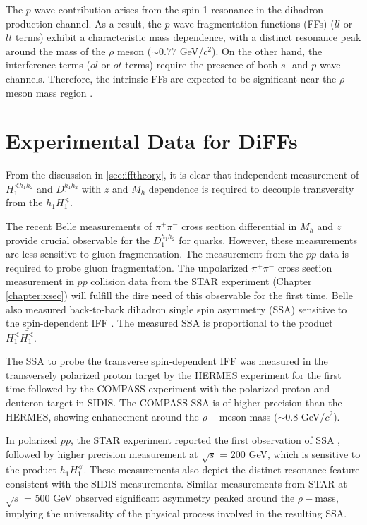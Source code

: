 The $p$-wave contribution arises from the spin-1 resonance in the dihadron production channel. As a result, the $p$-wave fragmentation functions (FFs) ($ll$ or $lt$ terms) exhibit a characteristic mass dependence, with a distinct resonance peak around the mass of the $\rho$ meson ($\sim 0.77$ GeV/$c^2$). On the other hand, the interference terms ($ol$ or $ot$ terms) require the presence of both $s$- and $p$-wave channels. Therefore, the intrinsic FFs are expected to be significant near the $\rho$ meson mass region \cite{Jaffe:1997hf, Bacchetta:2002ux, Bacchetta:2004it}.

\section{Experimental Data for DiFFs}
From the discussion in \ref{sec:ifftheory}, it is clear that independent measurement of $H_1^{\sphericalangle h_1h_2}$
and $D_1^{h_1h_2}$ with $z$ and $M_h$ dependence is required to decouple transversity from the $h_1H_1^\sphericalangle$. 

The recent Belle measurements of $\pi^+\pi^-$ cross section differential in $M_h$ and $z$ \cite{Belle:2017} provide crucial observable for the $D_1^{h_1h_2}$ for quarks. However, these measurements are less sensitive to gluon fragmentation. The measurement from the $pp$ data is required to probe gluon fragmentation. 
The unpolarized $\pi^+\pi^-$ cross section measurement in $pp$ collision data from the STAR experiment (Chapter \ref{chapter:xsec}) will fulfill the dire need of this observable for the first time. Belle also measured back-to-back dihadron single spin asymmetry (SSA) sensitive to the spin-dependent IFF \cite{Belle:2011}. The measured SSA is proportional to the product $H_1^\sphericalangle \bar{H_1^\sphericalangle}$. 

The SSA to probe the transverse spin-dependent IFF was measured in the transversely polarized proton target by the HERMES experiment for the first time\cite{HERMES:2008mcr} followed by the COMPASS experiment with the polarized proton and deuteron target \cite{COMPASS:2014ysd} in SIDIS. The COMPASS SSA is of higher precision than the HERMES, showing enhancement around the $\rho-$meson mass ($\sim 0.8$ GeV/$c^2$). 

In polarized $pp$, the STAR experiment reported the first observation of SSA \cite{STAR:2015jkc}, followed by higher precision measurement \cite{Landry:2016} at $\sqrt{s}$ = 200 GeV, which is sensitive to the product $h_1H_1^\sphericalangle$. These measurements also depict the distinct resonance feature consistent with the SIDIS measurements. Similar measurements from STAR at $\sqrt{s}$ = 500 GeV \cite{STAR:2017wsi} observed significant asymmetry peaked around the $\rho-$mass, implying the universality of the physical process involved in the resulting SSA. 





